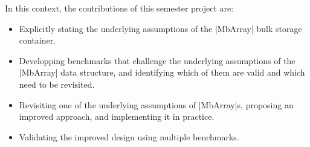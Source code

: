 In this context, the contributions of this semester project are:
\begin{itemize}
  \item Explicitly stating the underlying assumptions of the |MbArray| bulk storage container.
  \item Developping benchmarks that challenge the underlying assumptions of the |MbArray| data structure, and identifying which of them are valid and which need to be revisited.
  \item Revisiting one of the underlying assumptions of |MbArray|s, proposing an improved approach, and implementing it in practice.
  \item Validating the improved design using multiple benchmarks.
\end{itemize}



% 



